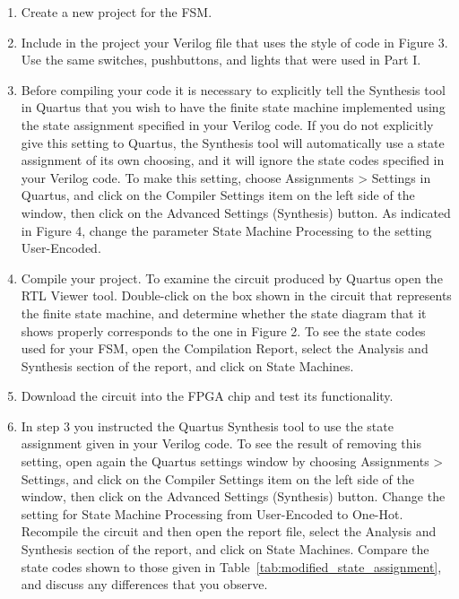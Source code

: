 \documentclass[epsfig,10pt,fullpage]{article}
\begin{document}
\begin{enumerate}
\item Create a new project for the FSM.

\item Include in the project your Verilog file that uses the style of code in Figure 3.
Use the same switches, pushbuttons, and lights that were used in Part I.

\item Before compiling your code it is necessary to explicitly tell the Synthesis tool in
Quartus that you wish to have the finite state machine implemented using the state
assignment specified in your Verilog code. If you do not explicitly give this
setting to Quartus, the Synthesis tool will automatically use a state assignment of
its own choosing, and it will ignore the state codes specified in your Verilog code. To
make this setting, choose {\sf Assignments > Settings} in Quartus, and click on the
{\sf Compiler Settings} item on the left side of the window, then click on 
the {\sf Advanced Settings (Synthesis)} button.  As indicated in Figure 4, change the 
parameter {\sf State Machine Processing} to the setting {\sf User-Encoded}.

\item Compile your project. To examine the circuit produced by Quartus open 
the RTL Viewer tool. Double-click
on the box shown in the circuit that represents the finite state machine, and determine
whether the state diagram that it shows properly corresponds to the one in Figure 2.
To see the state codes used for your FSM, open the Compilation Report, select the {\sf Analysis
and Synthesis} section of the report, and click on {\sf State Machines}.

\item Download the circuit into the FPGA chip and test its functionality.

\item In step 3 you instructed the Quartus Synthesis tool to use the state
assignment given in your Verilog code. To see the result of removing this setting, open
again the Quartus settings window by choosing {\sf Assignments > Settings}, and 
click on the {\sf Compiler Settings} item on the left side of the window, then click on 
the {\sf Advanced Settings (Synthesis)} button. Change the setting for  
{\sf State Machine Processing} from {\sf User-Encoded} to {\sf One-Hot}. Recompile the
circuit and then open the report file, select the {\sf Analysis
and Synthesis} section of the report, and click on {\sf State Machines}.
Compare the state codes shown to those given in Table~\ref{tab:modified_state_assignment}, and
discuss any differences that you observe.
\end{enumerate}
\end{document}
